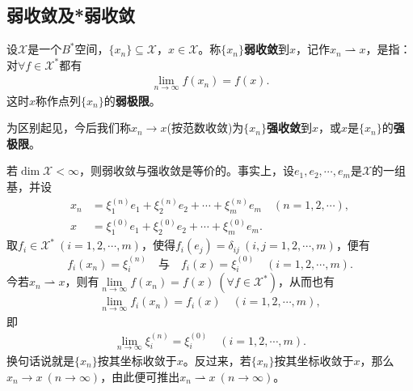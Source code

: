 \documentclass[../../main.tex]{subfiles}%
\begin{document}
\subsection{弱收敛及*弱收敛}

\begin{definition}
设$\mathscr{X}$是一个$B^*$空间，$\{x_n\}\subseteq\mathscr{X}$，$x\in\mathscr{X}$。称$\{x_n\}$\textbf{弱收敛}到$x$，记作$x_n\rightharpoonup x$，是指：对$\forall f\in\mathscr{X}^*$都有
\begin{align*}
\lim\limits_{n\to\infty} f(x_n)=f(x).
\end{align*}
这时$x$称作点列$\{x_n\}$的\textbf{弱极限}。

为区别起见，今后我们称$x_n\to x$(按范数收敛)为$\{x_n\}$\textbf{强收敛}到$x$，或$x$是$\{x_n\}$的\textbf{强极限}。
\end{definition}
\begin{remark}
若$\dim\mathscr{X}<\infty$，则弱收敛与强收敛是等价的。事实上，设$e_1,e_2,\cdots,e_m$是$\mathscr{X}$的一组基，并设
\begin{align*}
x_n&=\xi_1^{(n)}e_1+\xi_2^{(n)}e_2+\cdots+\xi_m^{(n)}e_m\quad(n=1,2,\cdots),\\
x&=\xi_1^{(0)}e_1+\xi_2^{(0)}e_2+\cdots+\xi_m^{(0)}e_m.
\end{align*}
取$f_i\in\mathscr{X}^*\ (i=1,2,\cdots,m)$，使得$f_i(e_j)=\delta_{ij}\ (i,j=1,2,\cdots,m)$，便有
$$f_i(x_n)=\xi_i^{(n)}\quad\text{与}\quad f_i(x)=\xi_i^{(0)}\quad(i=1,2,\cdots,m).$$
今若$x_n\rightharpoonup x$，则有$\lim\limits_{n\to\infty}f(x_n)=f(x)\ (\forall f\in\mathscr{X}^*)$，从而也有
\begin{align*}
\lim\limits_{n\to\infty} f_i(x_n)=f_i(x)\quad(i=1,2,\cdots,m),
\end{align*}
即
\begin{align*}
\lim\limits_{n\to\infty} \xi_i^{(n)}=\xi_i^{(0)}\quad(i=1,2,\cdots,m).
\end{align*}
换句话说就是$\{x_n\}$按其坐标收敛于$x$。反过来，若$\{x_n\}$按其坐标收敛于$x$，那么$x_n\to x\ (n\to\infty)$，由此便可推出$x_n\rightharpoonup x\ (n\to\infty)$。
\end{remark}
\end{document}
